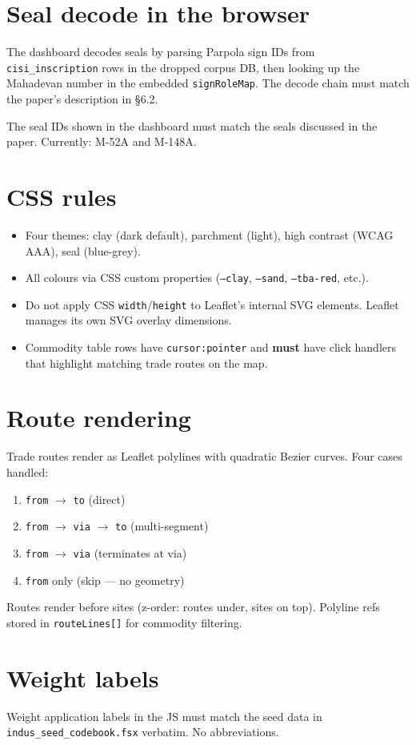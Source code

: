\documentclass[11pt]{article}
\begin{document}
\section{Seal decode in the browser}

The dashboard decodes seals by parsing Parpola sign IDs from
\texttt{cisi\_inscription} rows in the dropped corpus DB,
then looking up the Mahadevan number in the embedded
\texttt{signRoleMap}. The decode chain must match the paper's
description in \S6.2.

The seal IDs shown in the dashboard must match the seals
discussed in the paper. Currently: M-52A and M-148A.

\section{CSS rules}

\begin{itemize}[nosep]
\item Four themes: clay (dark default), parchment (light),
  high contrast (WCAG AAA), seal (blue-grey).
\item All colours via CSS custom properties (\texttt{--clay},
  \texttt{--sand}, \texttt{--tba-red}, etc.).
\item Do not apply CSS \texttt{width}/\texttt{height} to
  Leaflet's internal SVG elements. Leaflet manages its own
  SVG overlay dimensions.
\item Commodity table rows have \texttt{cursor:pointer} and
  \textbf{must} have click handlers that highlight matching
  trade routes on the map.
\end{itemize}

\section{Route rendering}

Trade routes render as Leaflet polylines with quadratic Bezier
curves. Four cases handled:
\begin{enumerate}[nosep]
\item \texttt{from} $\to$ \texttt{to} (direct)
\item \texttt{from} $\to$ \texttt{via} $\to$ \texttt{to} (multi-segment)
\item \texttt{from} $\to$ \texttt{via} (terminates at via)
\item \texttt{from} only (skip --- no geometry)
\end{enumerate}

Routes render before sites (z-order: routes under, sites on top).
Polyline refs stored in \texttt{routeLines[]} for commodity filtering.

\section{Weight labels}

Weight application labels in the JS must match the seed data
in \texttt{indus\_seed\_codebook.fsx} verbatim. No abbreviations.
\end{document}
